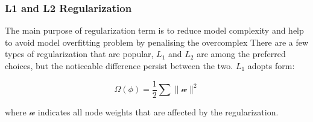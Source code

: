 \subsubsection{L1 and L2 Regularization}

The main purpose of regularization term is to reduce model complexity and help to avoid model overfitting problem by penalising the overcomplex  There are a few types of regularization that are popular, $L_1$ and $L_2$ are among the preferred choices, but the noticeable difference persist between the two. $L_1$ adopts form:

\begin{equation}
   \Omega(\phi) = \frac {1}{2} \sum \parallel \mathcal{w} \parallel^2
\end{equation}

where $\mathcal{w}$ indicates all node weights that are affected by the regularization. 